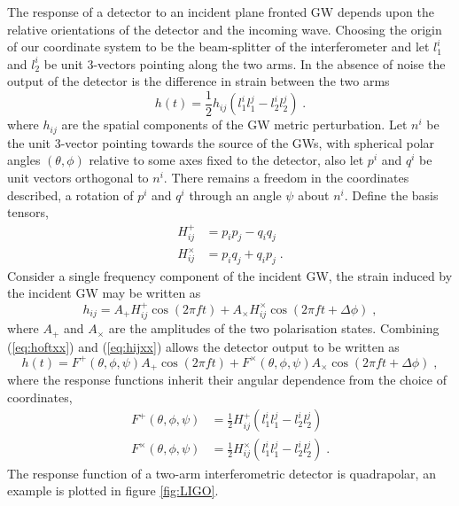 The response of a detector to an incident plane fronted GW depends upon the relative orientations of the detector and the incoming wave. Choosing the origin of our coordinate system to be the beam-splitter of the interferometer and let $l_{1}^{i}$ and $l_{2}^{i}$ be unit 3-vectors pointing along the two arms. In the absence of noise the output of the detector is the difference in strain between the two arms \citep{MTW}
\begin{equation}\label{eq:hoftxx} h(t)=\frac{1}{2}h_{ij}\left( l_{1}^{i}l_{1}^{j}-l_{2}^{i}l_{2}^{j} \right)\; . \end{equation}
where $h_{ij}$ are the spatial components of the GW metric perturbation. Let $n^{i}$ be the unit 3-vector pointing towards the source of the GWs, with spherical polar angles $(\theta,\phi)$ relative to some axes fixed to the detector, also let $p^{i}$ and $q^{i}$ be unit vectors orthogonal to $n^{i}$. There remains a freedom in the coordinates described, a rotation of $p^{i}$ and $q^{i}$ through an angle $\psi$ about $n^{i}$. Define the basis tensors,
\begin{eqnarray}
H^{+}_{ij}&=p_{i}p_{j}-q_{i}q_{j} \nonumber \\
H^{\times}_{ij}&=p_{i}q_{j}+q_{i}p_{j} \; .
\end{eqnarray}
Consider a single frequency component of the incident GW, the strain induced by the incident GW may be written as
\begin{equation}\label{eq:hijxx} h_{ij}=A_{+}H^{+}_{ij}\cos\left(2\pi ft\right)+A_{\times}H^{\times}_{ij}\cos\left(2\pi ft+\Delta \phi\right) \; ,\end{equation}
where $A_{+}$ and $A_{\times}$ are the amplitudes of the two polarisation states. Combining (\ref{eq:hoftxx}) and (\ref{eq:hijxx}) allows the detector output to be written as
\begin{equation} h(t)=F^{+}(\theta,\phi,\psi)A_{+}\cos\left(2\pi ft\right)+F^{\times}(\theta,\phi,\psi)A_{\times}\cos\left(2\pi f t + \Delta\phi \right)\; , \end{equation}
where the response functions inherit their angular dependence from the choice of coordinates,
\begin{eqnarray}
F^{+}(\theta,\phi,\psi)&=\frac{1}{2}H^{+}_{ij}\left(l_{1}^{i}l_{1}^{j}-l_{2}^{i}l_{2}^{j}\right) \nonumber \\
F^{\times}(\theta,\phi,\psi)&=\frac{1}{2}H^{\times}_{ij}\left(l_{1}^{i}l_{1}^{j}-l_{2}^{i}l_{2}^{j}\right) \; . 
\end{eqnarray}
The response function of a two-arm interferometric detector is quadrapolar, an example is plotted in figure \ref{fig:LIGO}.

